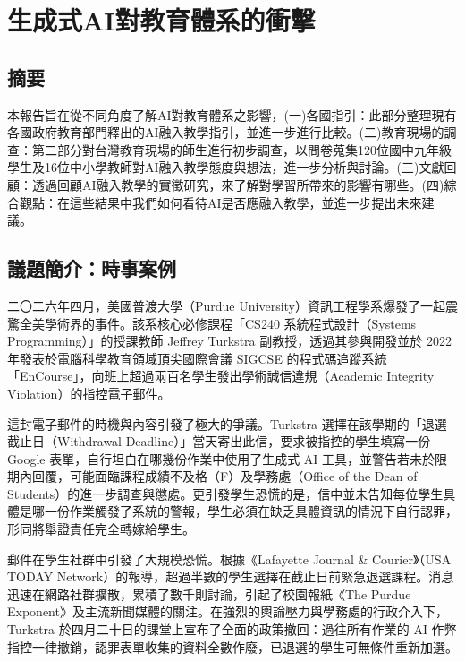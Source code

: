 \chapter{生成式AI對教育體系的衝擊}
\label{chap:生成式AI對教育體系的衝擊}


\section{摘要}\label{sec:摘要}

本報告旨在從不同角度了解AI對教育體系之影響，(一)各國指引：此部分整理現有各國政府教育部門釋出的AI融入教學指引，並進一步進行比較。(二)教育現場的調查：第二部分對台灣教育現場的師生進行初步調查，以問卷蒐集120位國中九年級學生及16位中小學教師對AI融入教學態度與想法，進一步分析與討論。(三)文獻回顧：透過回顧AI融入教學的實徵研究，來了解對學習所帶來的影響有哪些。(四)綜合觀點：在這些結果中我們如何看待AI是否應融入教學，並進一步提出未來建議。

\section{議題簡介：時事案例}\label{sec:時事案例}

二〇二六年四月，美國普渡大學（Purdue University）資訊工程學系爆發了一起震驚全美學術界的事件。該系核心必修課程「CS240 系統程式設計（Systems Programming）」的授課教師 Jeffrey Turkstra 副教授，透過其參與開發並於 2022 年發表於電腦科學教育領域頂尖國際會議 SIGCSE 的程式碼追蹤系統「EnCourse」\cite{rodriguez2022tracking}，向班上超過兩百名學生發出學術誠信違規（Academic Integrity Violation）的指控電子郵件\cite{arun2026ai,lafayette2026cheating}。

這封電子郵件的時機與內容引發了極大的爭議。Turkstra 選擇在該學期的「退選截止日（Withdrawal Deadline）」當天寄出此信，要求被指控的學生填寫一份 Google 表單，自行坦白在哪幾份作業中使用了生成式 AI 工具，並警告若未於限期內回覆，可能面臨課程成績不及格（F）及學務處（Office of the Dean of Students）的進一步調查與懲處\cite{arun2026ai,lafayette2026cheating}。更引發學生恐慌的是，信中並未告知每位學生具體是哪一份作業觸發了系統的警報，學生必須在缺乏具體資訊的情況下自行認罪，形同將舉證責任完全轉嫁給學生\cite{arun2026ai,bailey2026cheating}。

郵件在學生社群中引發了大規模恐慌。根據《Lafayette Journal \& Courier》（USA TODAY Network）的報導，超過半數的學生選擇在截止日前緊急退選課程\cite{lafayette2026cheating}。消息迅速在網路社群擴散，累積了數千則討論，引起了校園報紙《The Purdue Exponent》及主流新聞媒體的關注\cite{arun2026ai,lafayette2026cheating}。在強烈的輿論壓力與學務處的行政介入下，Turkstra 於四月二十日的課堂上宣布了全面的政策撤回：過往所有作業的 AI 作弊指控一律撤銷，認罪表單收集的資料全數作廢，已退選的學生可無條件重新加選\cite{arun2026ai}。

